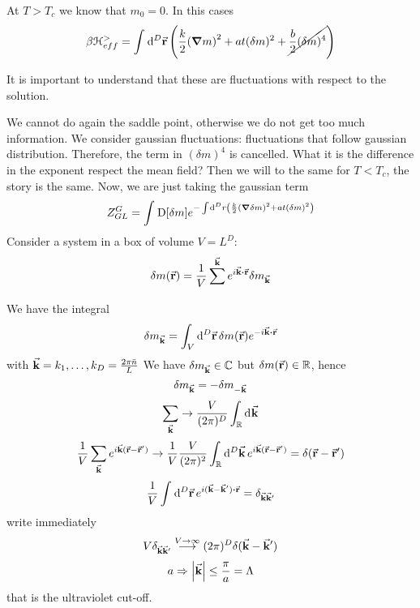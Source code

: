 \documentclass[../main/main.tex]{subfiles}
\begin{document}
At \( T > T_c \) we know that \( m_0 = 0 \).
In this cases
\begin{equation}
  \beta \mathcal{H}_{eff}^> = \int_{}^{} \dd[D]{\va{r}} \qty(\frac{k}{2} \qty(\grad m)^2 + a t (\delta m)^2 + \cancel{\frac{b}{2} (\delta m)^4} )
\end{equation}
\begin{remark}
It is important to understand that these are fluctuations with respect to the solution.
\end{remark}
We cannot do again the saddle point, otherwise we do not get too much information.
We consider gaussian fluctuations: fluctuations that follow gaussian distribution.
Therefore, the term in \( (\delta m)^4 \)  is cancelled.
What it is the difference in the exponent respect the mean field?
Then we will to the same for \( T < T_c \), the story is the same. Now, we are just taking the gaussian term
\begin{equation}
  Z_{GL}^G = \int_{}^{} \text{D} \qty[\delta m] e^{- \int_{}^{} \dd[D]{r} \qty(\frac{k}{2} \qty(\grad \delta m)^2 + a t (\delta m)^2  )  }
 \end{equation}
Consider a system in a box of volume \( V = L^D \):
\begin{equation}
  \delta m (\va{r}) = \frac{1}{V} \sum_{}^{\va{k}}  e^{i \va{k}\vdot \va{r}} \delta m_{\va{k}}
\end{equation}
We have the integral
\begin{equation}
  \delta m_{\va{k}} = \int_{V}^{} \dd[D]{\va{r}} \delta m (\va{r}) e^{-i \va{k} \vdot \va{r} }
\end{equation}
with \( \va{k} = k_1, \dots, k_D = \frac{2 \pi  \bar{n} }{L}\)
We have \( \delta m_{\va{k}} \in \mathbb{C} \) but \( \delta m (\va{r}) \in \mathbb{R} \), hence
\begin{equation}
  \delta m_{\va{k}} = - \delta m_{-\va{k}}
\end{equation}
\begin{equation}
  \sum_{\va{k}}^{} \rightarrow \frac{V}{( 2 \pi )^D} \int_{\mathbb{R}}^{} \dd[]{\va{k}}
\end{equation}
\begin{equation}
  \frac{1}{V} \sum_{\va{k}}^{} e^{i \va{k} (\va{r}-\va{r}')} \rightarrow \frac{1}{V} \frac{V}{(2 \pi )^2} \int_{\mathbb{R}}^{} \dd[D]{\va{k}} e^{i \va{k} (\va{r}-\va{r}')}
  = \delta (\va{r}- \va{r}')
\end{equation}
\begin{equation}
  \frac{1}{V} \int_{}^{} \dd[D]{\va{r}} e^{i (\va{k} - \va{k}') \vdot  \va{r}} = \delta _{\va{k}\va{k}'}
\end{equation}
write immediately
\begin{equation}
  V \delta _{\va{k} \va{k}'} \overset{V \rightarrow \infty }{\longrightarrow  } (2 \pi )^D \delta (\va{k} - \va{k}')
\end{equation}
\begin{equation}
  a \Rightarrow \abs{\va{k}} \le \frac{\pi }{a} = \Lambda
\end{equation}
that is the ultraviolet cut-off.
\end{document}
